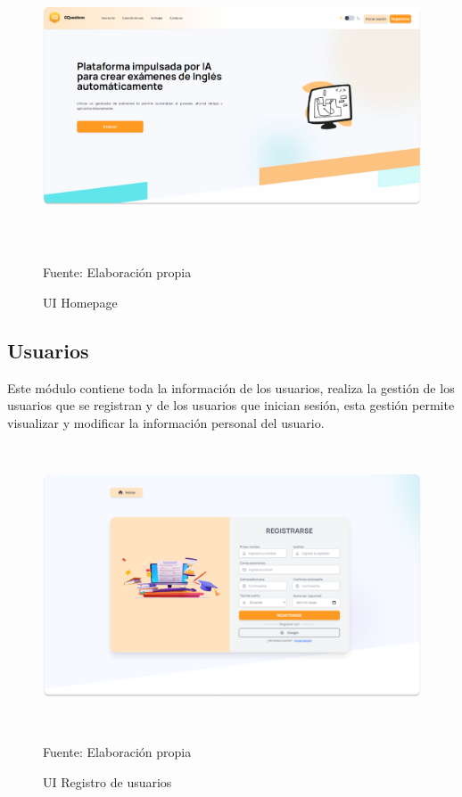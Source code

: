\documentclass[../Main.tex]{subfiles}
\begin{document}
    \begin{figure}[H]
	\begin{Center}
		\includegraphics[width=6.4in,height=3.3in]{Images/ui_homepage.png}
	    \caption{UI Homepage}
	    Fuente: Elaboración propia
        \label{fig:section}
	\end{Center}
    \end{figure}
    
\newpage    %
    \subsection{Usuarios}
    \begin{justify}
    Este módulo contiene toda la información de los usuarios, realiza la gestión de los usuarios que se registran y de los usuarios que inician sesión, esta gestión permite visualizar y modificar la información personal del usuario.  
    \end{justify}
    
    \begin{figure}[H]
	\begin{Center}
		\includegraphics[width=6.4in,height=3.3in]{Images/ui_usuario_registro.png}
	    \caption{UI Registro de usuarios}
	    Fuente: Elaboración propia
        \label{fig:section}
	\end{Center}
    \end{figure}
    
\end{document}
